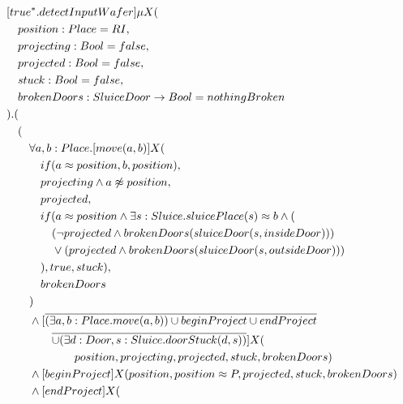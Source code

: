 \begin{description}
\begin{align*}\allowdisplaybreaks
& [true^*.detectInputWafer] \mu X( \\
&          \tab                          position: Place = RI,    \\  
&          \tab                          projecting: Bool = false,  \\
&          \tab                          projected: Bool = false,   \\
&          \tab                          stuck: Bool = false,       \\
&          \tab                          brokenDoors: SluiceDoor \to Bool = nothingBroken   \\
&                                 ).( \\
&  \tab ( \\
&  \tab\tab  \forall a,b:Place.[move(a,b)]X( \\
&  \tab\tab  \tab                              if(a \approx position, b, position), \\
&  \tab\tab  \tab                              projecting \wedge a \not \approx position, \\
&  \tab\tab  \tab                              projected, \\
&  \tab\tab  \tab                              if(a \approx position \wedge \exists s:Sluice . sluicePlace(s) \approx b \wedge ( \\
& \tab\tab\tab\tab (\neg projected \wedge brokenDoors(sluiceDoor(s, insideDoor))) \\ 
& \tab\tab\tab\tab \vee (projected \wedge brokenDoors(sluiceDoor(s, outsideDoor))) \\
& \tab\tab\tab ), true, stuck), \\
&  \tab\tab  \tab                              brokenDoors \\
&  \tab\tab                               ) \\
&  \tab\tab  \wedge [\overline{(\exists a,b:Place.move(a,b)) \cup beginProject \cup endProject} \\
& \tab\tab\tab\tab \overline{ \cup (\exists d:Door,s:Sluice.doorStuck(d, s))}]X( \\
& \tab\tab\tab\tab\tab\tab position, projecting, projected, stuck, brokenDoors) \\
&  \tab\tab  \wedge [beginProject]X(position, position \approx P, projected, stuck, brokenDoors) \\
&  \tab\tab  \wedge [endProject]X(\\

\end{align*}
\end{description}

